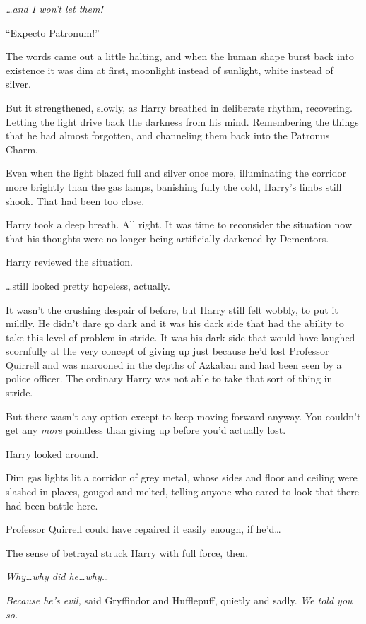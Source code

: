 \emph{…and I won’t let them!}

“Expecto Patronum!”

The words came out a little halting, and when the human shape burst back into existence it was dim at first, moonlight instead of sunlight, white instead of silver.

But it strengthened, slowly, as Harry breathed in deliberate rhythm, recovering. Letting the light drive back the darkness from his mind. Remembering the things that he had almost forgotten, and channeling them back into the Patronus Charm.

Even when the light blazed full and silver once more, illuminating the corridor more brightly than the gas lamps, banishing fully the cold, Harry’s limbs still shook. That had been too close.

Harry took a deep breath. All right. It was time to reconsider the situation now that his thoughts were no longer being artificially darkened by Dementors.

Harry reviewed the situation.

…still looked pretty hopeless, actually.

It wasn’t the crushing despair of before, but Harry still felt wobbly, to put it mildly. He didn’t dare go dark and it was his dark side that had the ability to take this level of problem in stride. It was his dark side that would have laughed scornfully at the very concept of giving up just because he’d lost Professor Quirrell and was marooned in the depths of Azkaban and had been seen by a police officer. The ordinary Harry was not able to take that sort of thing in stride.

But there wasn’t any option except to keep moving forward anyway. You couldn’t get any \emph{more} pointless than giving up before you’d actually lost.

Harry looked around.

Dim gas lights lit a corridor of grey metal, whose sides and floor and ceiling were slashed in places, gouged and melted, telling anyone who cared to look that there had been battle here.

Professor Quirrell could have repaired it easily enough, if he’d…

The sense of betrayal struck Harry with full force, then.

\emph{Why…why did he…why…}

\emph{Because he’s evil,} said Gryffindor and Hufflepuff, quietly and sadly. \emph{We told you so.}

